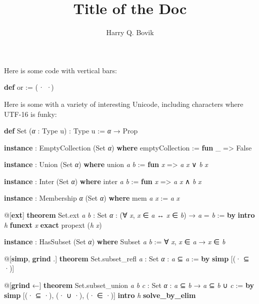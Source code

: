 \documentclass{memoir}
\title{\sffamily Title of the Doc}
\author{\sffamily Harry Q. Bovik}
\date{\sffamily }
\begin{document}
\frontmatter

\begin{titlingpage}
\maketitle
\end{titlingpage}

\tableofcontents


\cleardoublepage
Here is some code with vertical bars:
\begin{LeanVerbatim}
\textbf{def} or := (\textit{·}  \textit{·})

\end{LeanVerbatim}

Here is some with a variety of interesting Unicode, including characters where UTF-16 is funky:
\begin{LeanVerbatim}
\textbf{def} Set (\textit{α} : Type u) : Type u := \textit{α} → Prop

\textbf{instance} : EmptyCollection (Set \textit{α}) \textbf{where}
  emptyCollection := \textbf{fun} _ => False

\textbf{instance} : Union (Set \textit{α}) \textbf{where}
  union \textit{a} \textit{b} := \textbf{fun} \textit{x} => \textit{a} \textit{x} ∨ \textit{b} \textit{x}

\textbf{instance} : Inter (Set \textit{α}) \textbf{where}
  inter \textit{a} \textit{b} := \textbf{fun} \textit{x} => \textit{a} \textit{x} ∧ \textit{b} \textit{x}

\textbf{instance} : Membership \textit{α} (Set \textit{α}) \textbf{where}
  mem \textit{a} \textit{x} := \textit{a} \textit{x}

@[\textbf{ext}]
\textbf{theorem} Set.ext \textit{a} \textit{b} : Set \textit{α} :
    (∀ \textit{x}, \textit{x} ∈ \textit{a} ↔ \textit{x} ∈ \textit{b}) → \textit{a} = \textit{b} := \textbf{by}
  \textbf{intro} \textit{h}
  \textbf{funext} \textit{x}
  \textbf{exact} propext (\textit{h} \textit{x})

\textbf{instance} : HasSubset (Set \textit{α}) \textbf{where}
  Subset \textit{a} \textit{b} := ∀ \textit{x}, \textit{x} ∈ \textit{a} → \textit{x} ∈ \textit{b}

@[\textbf{simp}, \textbf{grind} .]
\textbf{theorem} Set.subset_refl \textit{a} : Set \textit{α} : \textit{a} ⊆ \textit{a} := \textbf{by}
  \textbf{simp} [(· ⊆ ·)]

@[\textbf{grind} ←]
\textbf{theorem} Set.subset_union \textit{a} \textit{b} \textit{c} : Set \textit{α} :
    \textit{a} ⊆ \textit{b} → \textit{a} ⊆ \textit{b} ∪ \textit{c} := \textbf{by}
  \textbf{simp} [(· ⊆ ·), (· ∪ ·), (· ∈ ·)]
  \textbf{intro} \textit{h}
  \textbf{solve_by_elim}


\end{LeanVerbatim}
\end{document}

